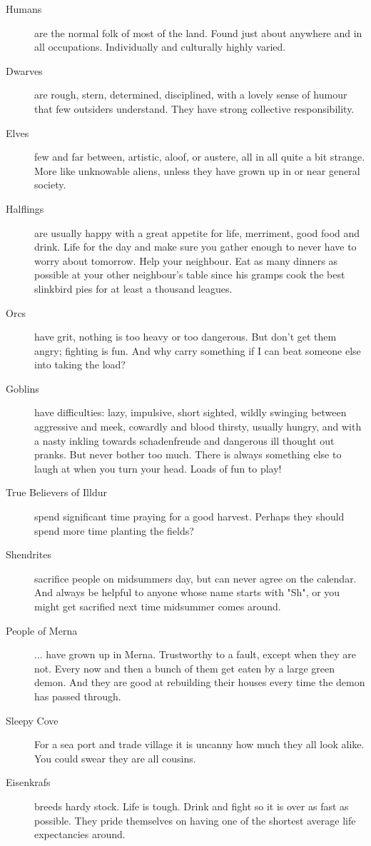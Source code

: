 \begin{description}

\item[Humans] are the normal folk of most of the land. Found just about anywhere and in all occupations. Individually and culturally highly varied.

\item[Dwarves] are rough, stern, determined, disciplined, with a lovely sense of humour that few outsiders understand. They have strong collective responsibility.

\item[Elves] few and far between, artistic, aloof, or austere, all in all quite a bit strange. More like unknowable aliens, unless they have grown up in or near general society.

\item[Halflings] are usually happy with a great appetite for life, merriment, good food and drink. Life for the day and make sure you gather enough to never have to worry about tomorrow. Help your neighbour. Eat as many dinners as possible at your other neighbour's table since his gramps cook the best slinkbird pies for at least a thousand leagues.

\item[Orcs] have grit, nothing is too heavy or too dangerous. But don't get them angry; fighting is fun. And why carry something if I can beat someone else into taking the load?

\item[Goblins] have difficulties: lazy, impulsive, short sighted, wildly swinging between aggressive and meek, cowardly and blood thirsty, usually hungry, and with a nasty inkling towards schadenfreude and dangerous ill thought out pranks. But never bother too much. There is always something else to laugh at when you turn your head. Loads of fun to play!

\item[True Believers of Illdur] spend significant time praying for a good harvest. Perhaps they should spend more time planting the fields?

\item[Shendrites] sacrifice people on midsummers day, but can never agree on the calendar. And always be helpful to anyone whose name starts with "Sh", or you might get sacrified next time midsummer comes around.

\item[People of Merna] ... have grown up in Merna. Trustworthy to a fault, except when they are not. Every now and then a bunch of them get eaten by a large green demon. And they are good at rebuilding their houses every time the demon has passed through.

\item[Sleepy Cove] For a sea port and trade village it is uncanny how much they all look alike. You could swear they are all cousins.

\item[Eisenkrafs] breeds hardy stock. Life is tough. Drink and fight so it is over as fast as possible. They pride themselves on having one of the shortest average life expectancies around.

\end{description}


